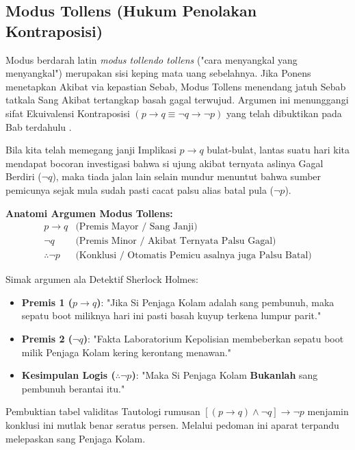 \subsection{Modus Tollens (Hukum Penolakan Kontraposisi)}

Modus berdarah latin \textit{modus tollendo tollens} ("cara menyangkal yang menyangkal") merupakan sisi keping mata uang sebelahnya. Jika Ponens menetapkan Akibat via kepastian Sebab, Modus Tollens menendang jatuh Sebab tatkala Sang Akibat tertangkap basah gagal terwujud. Argumen ini menunggangi sifat Ekuivalensi Kontraposisi $(p \rightarrow q \equiv \neg q \rightarrow \neg p)$ yang telah dibuktikan pada Bab terdahulu \cite{rosen2019}.

\begin{teorema}
Bila kita telah memegang janji Implikasi $p \rightarrow q$ bulat-bulat, lantas suatu hari kita mendapat bocoran investigasi bahwa si ujung akibat ternyata aslinya Gagal Berdiri ($\neg q$), maka tiada jalan lain selain mundur menuntut bahwa sumber pemicunya sejak mula sudah pasti cacat palsu alias batal pula ($\neg p$).
\end{teorema}

\textbf{Anatomi Argumen Modus Tollens:}
\[
\begin{array}{cl}
p \rightarrow q & \text{(Premis Mayor / Sang Janji)} \\
\neg q & \text{(Premis Minor / Akibat Ternyata Palsu Gagal)} \\
\hline
\therefore \neg p & \text{(Konklusi / Otomatis Pemicu asalnya juga Palsu Batal)}
\end{array}
\]

\begin{contoh}
Simak argumen ala Detektif Sherlock Holmes:
\begin{itemize}
    \item \textbf{Premis 1 ($p \rightarrow q$)}: "Jika Si Penjaga Kolam adalah sang pembunuh, maka sepatu boot miliknya hari ini pasti basah kuyup terkena lumpur parit."
    \item \textbf{Premis 2 ($\neg q$)}: "Fakta Laboratorium Kepolisian membeberkan sepatu boot milik Penjaga Kolam kering kerontang menawan."
    \item \textbf{Kesimpulan Logis ($\therefore \neg p$)}: "Maka Si Penjaga Kolam \textbf{Bukanlah} sang pembunuh berantai itu."
\end{itemize}
\end{contoh}
Pembuktian tabel validitas Tautologi rumusan $[(p \rightarrow q) \land \neg q] \rightarrow \neg p$ menjamin konklusi ini mutlak benar seratus persen. Melalui pedoman ini aparat terpandu melepaskan sang Penjaga Kolam.
